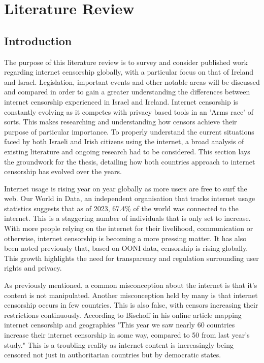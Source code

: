 \chapter{Literature Review}

\section{Introduction}

The purpose of this literature review is to survey and consider published work regarding internet censorship globally, with a particular focus on that of Ireland and Israel. Legislation, important events and other notable areas will be discussed and compared in order to gain a greater understanding the differences between internet censorship experienced in Israel and Ireland. Internet censorship is constantly evolving as it competes with privacy based tools in an 'Arms race' of sorts. This makes researching and understanding how censors achieve their purpose of particular importance. To properly understand the current situations faced by both Israeli and Irish citizens using the internet, a broad analysis of existing literature and ongoing research had to be considered. This section lays the groundwork for the thesis, detailing how both countries approach to internet censorship has evolved over the years. 

Internet usage is rising year on year globally as more users are free to surf the web. Our World in Data, an independent organisation that tracks internet usage statistics suggests that as of 2023, 67.4\% of the world was connected to the internet. \cite{owid-internet} This is a staggering number of individuals that is only set to increase. With more people relying on the internet for their livelihood, communication or otherwise, internet censorship is becoming a more pressing matter. It has also been noted previously that, based on OONI data, censorship is rising globally. This growth highlights the need for transparency and regulation surrounding user rights and privacy. 

As previously mentioned, a common misconception about the internet is that it's content is not manipulated. Another misconception held by many is that internet censorship occurs in few countries. This is also false, with censors increasing their restrictions continuously. According to Bischoff in his online article mapping internet censorship and geographies "This year we saw nearly 60 countries increase their internet censorship in some way, compared to 50 from last year’s study."\cite{bischoff2025internet} This is a troubling reality as internet content is increasingly being censored not just in authoritarian countries but by democratic states. 

